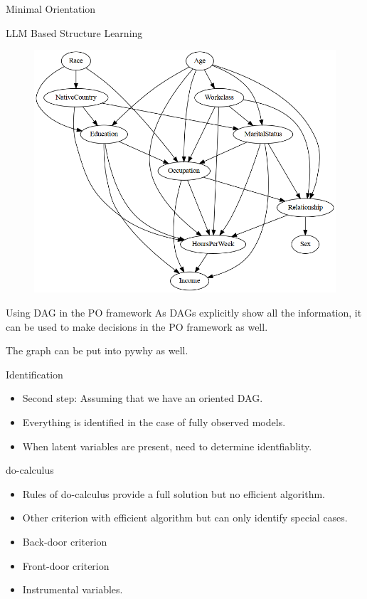 \documentclass{beamer}
\begin{document}
\begin{frame}{Minimal Orientation}
\end{frame}

\begin{frame}{LLM Based Structure Learning}
	\begin{figure}
		\centering
		\includegraphics[scale=0.3]{imgs/adult_llm.png}
	\end{figure}
\end{frame}

\begin{frame}{Using DAG in the PO framework}
	As DAGs explicitly show all the information, it can be used to make
	decisions in the PO framework as well.

	The graph can be put into pywhy as well.
\end{frame}

\begin{frame}{Identification}
	\begin{itemize}
		\item Second step: Assuming that we have an oriented DAG.
		\item Everything is identified in the case of fully observed models.
		\item When latent variables are present, need to determine identfiablity.
	\end{itemize}
\end{frame}

\begin{frame}{do-calculus}
	\begin{itemize}
		\item Rules of do-calculus provide a full solution but no
			efficient algorithm.
		\item Other criterion with efficient algorithm but can only
			identify special cases.
		\item Back-door criterion
		\item Front-door criterion
		\item Instrumental variables.
	\end{itemize}
\end{frame}
\end{document}
